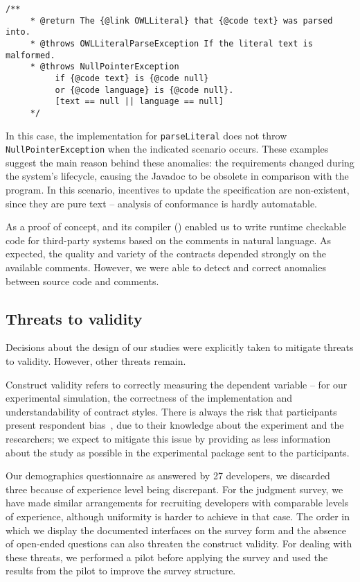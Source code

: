 \begin{lstlisting}[basicstyle=\footnotesize\ttfamily,name=figxpi, frame=lines, mathescape=true]
 /**
     * @return The {@link OWLLiteral} that {@code text} was parsed into.
     * @throws OWLLiteralParseException If the literal text is malformed.
     * @throws NullPointerException 
          if {@code text} is {@code null} 
          or {@code language} is {@code null}. 
          [text == null || language == null]
     */
\end{lstlisting}

In this case, the implementation for \texttt{parseLiteral} does not throw \texttt{NullPointerException} when the indicated scenario occurs.
These examples suggest the main reason behind these anomalies: the requirements changed during the system's lifecycle, causing the Javadoc to be obsolete in comparison with the program. In this scenario, incentives to update the specification are non-existent, since they are pure text -- analysis of conformance is hardly automatable. 

As a proof of concept, \contractjdoc{} and its compiler (\contractjdocCompiler{}) enabled us to write runtime
checkable code for third-party systems based on the comments in natural language.
As expected, the quality and variety of the contracts depended strongly on the available comments. However, we were able to
detect and correct anomalies between source code and comments.

\subsection{Threats to validity}
\label{sec:CaseStudyThreats}

Decisions about the design of our studies were explicitly taken to mitigate threats to validity. However, other threats remain.

Construct validity refers to correctly measuring the
dependent variable -- for our experimental simulation, the correctness of the implementation and understandability of contract styles.
There is always the risk that participants present respondent bias~\cite{refSurvey}, due to their knowledge about the experiment and the researchers; we expect to mitigate this issue by providing as less information about the study as possible in the experimental package sent to the participants.

Our demographics questionnaire as answered by 27 developers, we discarded three because of experience level being discrepant.
For the judgment survey, we have made similar arrangements for recruiting developers with comparable levels of experience, although uniformity is harder to achieve in that case.
The order in which we display the documented
interfaces on the survey form and the absence of open-ended questions can also threaten the construct validity. For dealing with these threats, we
performed a pilot before applying the survey and used the results from the pilot to improve the survey structure. 


